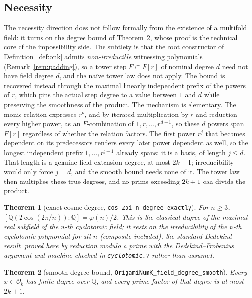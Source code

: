 \documentclass[11pt]{amsart}
\theoremstyle{plain}
\newtheorem{theorem}{Theorem}[section]
\theoremstyle{definition}
\newcommand{\Ok}{\mathscr{O}_k}
\newcommand{\Q}{\mathbb{Q}}
\newcommand{\code}[1]{\texttt{#1}}
\begin{document}
\subsection{Necessity}

The necessity direction does not follow formally from the existence of a multifold field: it turns on the degree bound of Theorem~\ref{thm:degbound}, whose proof is the technical core of the impossibility side. The subtlety is that the root constructor of Definition~\ref{def:onk} admits \emph{non-irreducible} witnessing polynomials (Remark~\ref{rem:padding}), so a tower step $F \subset F[r]$ of nominal degree $d$ need not have field degree $d$, and the na\"ive tower law does not apply. The bound is recovered instead through the maximal linearly independent prefix of the powers of $r$, which pins the actual step degree to a value between $1$ and $d$ while preserving the smoothness of the product. The mechanism is elementary. The monic relation expresses $r^d$, and by iterated multiplication by $r$ and reduction every higher power, as an $F$-combination of $1, r, \dots, r^{d-1}$, so these $d$ powers span $F[r]$ regardless of whether the relation factors. The first power $r^j$ that becomes dependent on its predecessors renders every later power dependent as well, so the longest independent prefix $1, \dots, r^{j-1}$ already spans: it is a basis, of length $j \le d$. That length is a genuine field-extension degree, at most $2k+1$; irreducibility would only force $j = d$, and the smooth bound needs none of it. The tower law then multiplies these true degrees, and no prime exceeding $2k+1$ can divide the product.

\begin{theorem}[exact cosine degree, \code{cos\_2pi\_n\_degree\_exactly}]\label{thm:cosdeg}
For $n \ge 3$, $[\Q(2\cos(2\pi/n)) : \Q] = \varphi(n)/2$. This is the classical degree of the maximal real subfield of the $n$-th cyclotomic field; it rests on the irreducibility of the $n$-th cyclotomic polynomial for all $n$ (composite included), the standard Dedekind result, proved here by reduction modulo a prime with the Dedekind--Frobenius argument and machine-checked in \code{cyclotomic.v} rather than assumed.
\end{theorem}

\begin{theorem}[smooth degree bound, \code{OrigamiNumK\_field\_degree\_smooth}]\label{thm:degbound}
Every $x \in \Ok$ has finite degree over $\Q$, and every prime factor of that degree is at most $2k+1$.
\end{theorem}
\end{document}
